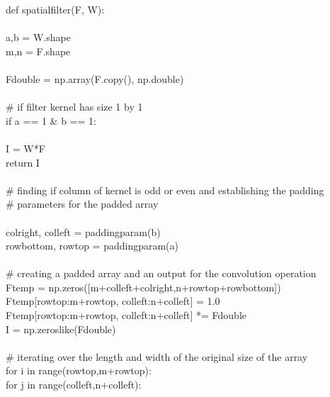 \documentclass{article}
\begin{document}
	\noindent def spatial\textunderscore filter(F, W):\\
	\\
	\indent a,b = W.shape\\
	\indent m,n = F.shape\\
	\\
	\indent F\textunderscore double = np.array(F.copy(), np.double)\\
	\\
	\indent \# if filter kernel has size 1 by 1\\
	\indent if a == 1 \& b == 1:\\
	\\
	\indent \indent I = W*F\\
	\indent \indent return I\\
	\\
	\indent \# finding if column of kernel is odd or even and establishing the padding\\ 
	\indent \# parameters for the padded array\\
	\\
	\indent col\textunderscore right, col\textunderscore left = padding\textunderscore param(b)\\
	\indent row\textunderscore bottom, row\textunderscore top = padding\textunderscore param(a)\\
	\\
	\indent \# creating a padded array and an output for the convolution operation \\
	\indent F\textunderscore temp = np.zeros([m+col\textunderscore left+col\textunderscore right,n+row\textunderscore top+row\textunderscore bottom])\\
	\indent F\textunderscore temp[row\textunderscore top:m+row\textunderscore top, col\textunderscore left:n+col\textunderscore left] = 1.0\\
	\indent F\textunderscore temp[row\textunderscore top:m+row\textunderscore top, col\textunderscore left:n+col\textunderscore left] *= F\textunderscore double\\
	\indent I = np.zeros\textunderscore like(F\textunderscore double)\\
	\\
	\indent \# iterating over the length and width of the original size of the array\\
	\indent for i in range(row\textunderscore top,m+row\textunderscore top):\\
	\indent \indent for j in range(col\textunderscore left,n+col\textunderscore left):\\
\end{document}
